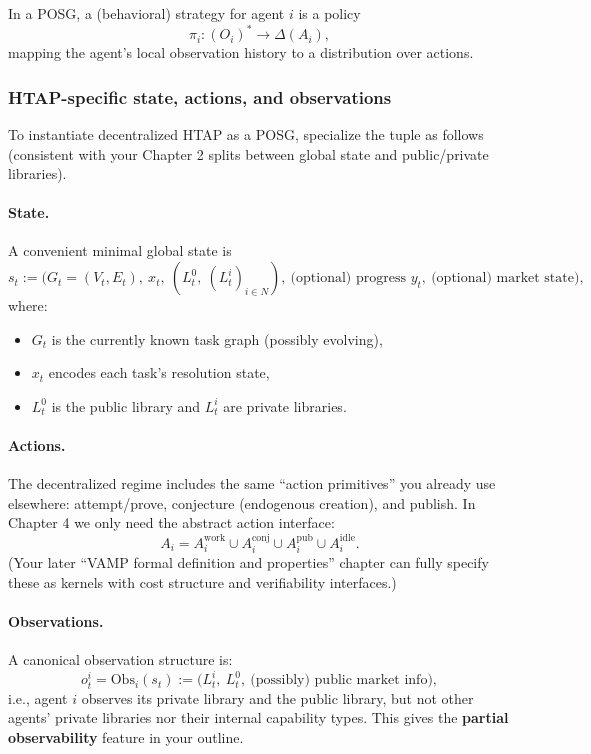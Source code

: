 In a POSG, a (behavioral) strategy for agent \(i\) is a policy
\[
\pi_i : (O_i)^* \to \Delta(A_i),
\]
mapping the agent's local observation history to a distribution over actions.

\subsubsection{HTAP-specific state, actions, and observations}

To instantiate decentralized HTAP as a POSG, specialize the tuple as follows (consistent with your Chapter 2 splits between global state and public/private libraries).

\paragraph{State.}
A convenient minimal global state is
\[
s_t := \big(G_t=(V_t,E_t),\ x_t,\ (L_t^0,\ (L_t^i)_{i\in N}),\ \text{(optional) progress } y_t,\ \text{(optional) market state}\big),
\]
where:
\begin{itemize}
\item \(G_t\) is the currently known task graph (possibly evolving),
\item \(x_t\) encodes each task's resolution state,
\item \(L_t^0\) is the public library and \(L_t^i\) are private libraries.
\end{itemize}

\paragraph{Actions.}
The decentralized regime includes the same ``action primitives'' you already use elsewhere: attempt/prove, conjecture (endogenous creation), and publish. In Chapter 4 we only need the abstract action interface:
\[
A_i = A_i^{\mathrm{work}} \cup A_i^{\mathrm{conj}} \cup A_i^{\mathrm{pub}} \cup A_i^{\mathrm{idle}}.
\]
(Your later ``VAMP formal definition and properties'' chapter can fully specify these as kernels with cost structure and verifiability interfaces.)

\paragraph{Observations.}
A canonical observation structure is:
\[
o_t^i = \mathrm{Obs}_i(s_t) := \big(L_t^i,\ L_t^0,\ \text{(possibly) public market info}\big),
\]
i.e., agent \(i\) observes its private library and the public library, but not other agents' private libraries nor their internal capability types. This gives the \textbf{partial observability} feature in your outline.

